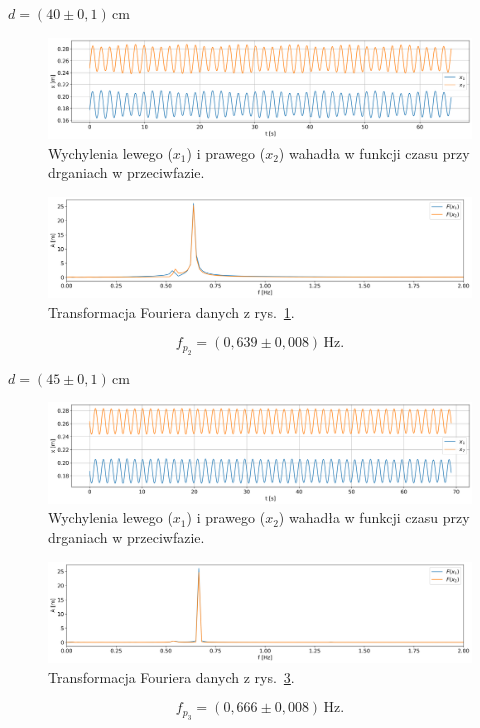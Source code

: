 \documentclass[12pt]{article}
\begin{document}
\(d = (40 \pm 0{,}1)\,\mathrm{cm}\)
\begin{figure}[H]
	\centering
	\includegraphics[width=\linewidth]{counterphase_2}
	\caption{Wychylenia lewego (\(x_1\)) i prawego (\(x_2\)) wahadła w funkcji czasu przy drganiach w przeciwfazie.}
	\label{fig:counter_phase_1}
\end{figure}
\begin{figure}[H]
	\centering
	\includegraphics[width=\linewidth]{counterphase_2_fft}
	\caption{Transformacja Fouriera danych z rys.~\ref{fig:counter_phase_1}.}
	\label{fig:coutner_phase_1_fft}
\end{figure}
\[
	f_{p_2} = (0{,}639 \pm 0{,}008)\,\mathrm{Hz}.
\]

\(d = (45 \pm 0{,}1)\,\mathrm{cm}\)
\begin{figure}[H]
	\centering
	\includegraphics[width=\linewidth]{counterphase_3}
	\caption{Wychylenia lewego (\(x_1\)) i prawego (\(x_2\)) wahadła w funkcji czasu przy drganiach w przeciwfazie.}
	\label{fig:counter_phase_2}
\end{figure}
\begin{figure}[H]
	\centering
	\includegraphics[width=\linewidth]{counterphase_3_fft}
	\caption{Transformacja Fouriera danych z rys.~\ref{fig:counter_phase_2}.}
	\label{fig:coutner_phase_2_fft}
\end{figure}
\[
	f_{p_3} = (0{,}666 \pm 0{,}008)\,\mathrm{Hz}.
\]
\end{document}
